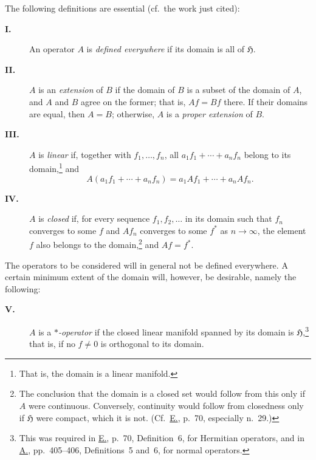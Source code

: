 \documentclass[fontsize=13pt,paper=b5,leqno,bookmarkpackage=false]{scrartcl}
\begin{document}
The following definitions are essential (cf.\ the work just cited):

\begin{description}
\item[\textbf{I.}]
An operator \(A\) is \emph{defined everywhere} if its domain is all of
\(\mathfrak H\).

\item[\textbf{II.}]
\(A\) is an \emph{extension} of \(B\) if the domain of \(B\) is a subset
of the domain of \(A\), and \(A\) and \(B\) agree on the former; that is,
\(Af=Bf\) there. If their domains are equal, then \(A=B\); otherwise,
\(A\) is a \emph{proper extension} of \(B\).

\item[\textbf{III.}]
\(A\) is \emph{linear} if, together with \(f_1,\ldots,f_n\), all
\(a_1f_1+\cdots+a_nf_n\) belong to its domain,\footnote{\label{fn:2}%
That is, the domain is a linear manifold.} and
\[
  A(a_1f_1+\cdots+a_nf_n)
  =a_1Af_1+\cdots+a_nAf_n .
\]

\item[\textbf{IV.}]
\(A\) is \emph{closed} if, for every sequence \(f_1,f_2,\ldots\) in its
domain such that \(f_n\) converges to some \(f\) and \(Af_n\) converges
to some \(f^*\) as \(n\to\infty\), the element \(f\) also belongs to the
domain,\footnote{\label{fn:3}%
The conclusion that the domain is a closed set would follow from this
only if \(A\) were continuous. Conversely, continuity would follow from
closedness only if \(\mathfrak H\) were compact, which it is not.
(Cf.\ \hyperlink{bib:E}{E.}, p.~70, especially n.~29.)} and \(Af=f^*\).
\end{description}

The operators to be considered will in general not be defined
everywhere. A certain minimum extent of the domain will, however, be
desirable, namely the following:


\begin{description}
\item[\textbf{V.}]
\(A\) is a \emph{\(*\)-operator} if the closed linear manifold spanned by
its domain is \(\mathfrak H\),\footnote{\label{fn:4}%
This was required in \hyperlink{bib:E}{E.}, p.~70, Definition~6, for
Hermitian operators, and in \hyperlink{bib:A}{A.}, pp.~405--406,
Definitions~5 and~6, for normal operators.}
that is, if no \(f\ne0\) is orthogonal to its domain.
\end{description}
\end{document}

